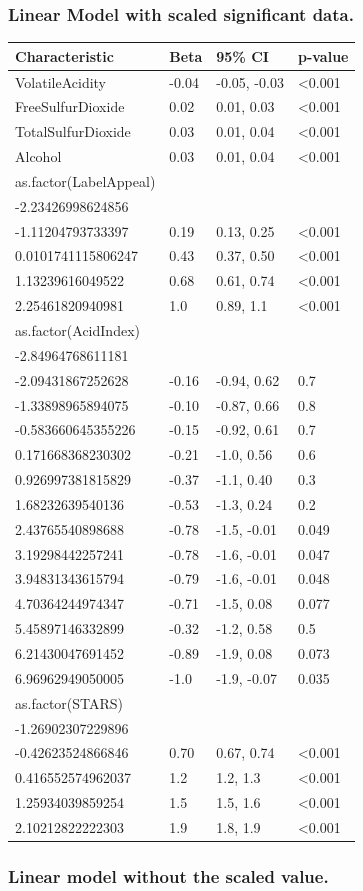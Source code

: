 \documentclass[]{elsarticle} %
\begin{document}
\hypertarget{linear-model-with-scaled-significant-data.}{%
\subsubsection{Linear Model with scaled significant
data.}\label{linear-model-with-scaled-significant-data.}}

\begin{longtable}[]{@{}llll@{}}
\toprule
\textbf{Characteristic} & \textbf{Beta} & \textbf{95\% CI} &
\textbf{p-value}\tabularnewline
\midrule
\endhead
VolatileAcidity & -0.04 & -0.05, -0.03 & \textless0.001\tabularnewline
FreeSulfurDioxide & 0.02 & 0.01, 0.03 & \textless0.001\tabularnewline
TotalSulfurDioxide & 0.03 & 0.01, 0.04 & \textless0.001\tabularnewline
Alcohol & 0.03 & 0.01, 0.04 & \textless0.001\tabularnewline
as.factor(LabelAppeal) & & &\tabularnewline
-2.23426998624856 & & &\tabularnewline
-1.11204793733397 & 0.19 & 0.13, 0.25 & \textless0.001\tabularnewline
0.0101741115806247 & 0.43 & 0.37, 0.50 & \textless0.001\tabularnewline
1.13239616049522 & 0.68 & 0.61, 0.74 & \textless0.001\tabularnewline
2.25461820940981 & 1.0 & 0.89, 1.1 & \textless0.001\tabularnewline
as.factor(AcidIndex) & & &\tabularnewline
-2.84964768611181 & & &\tabularnewline
-2.09431867252628 & -0.16 & -0.94, 0.62 & 0.7\tabularnewline
-1.33898965894075 & -0.10 & -0.87, 0.66 & 0.8\tabularnewline
-0.583660645355226 & -0.15 & -0.92, 0.61 & 0.7\tabularnewline
0.171668368230302 & -0.21 & -1.0, 0.56 & 0.6\tabularnewline
0.926997381815829 & -0.37 & -1.1, 0.40 & 0.3\tabularnewline
1.68232639540136 & -0.53 & -1.3, 0.24 & 0.2\tabularnewline
2.43765540898688 & -0.78 & -1.5, -0.01 & 0.049\tabularnewline
3.19298442257241 & -0.78 & -1.6, -0.01 & 0.047\tabularnewline
3.94831343615794 & -0.79 & -1.6, -0.01 & 0.048\tabularnewline
4.70364244974347 & -0.71 & -1.5, 0.08 & 0.077\tabularnewline
5.45897146332899 & -0.32 & -1.2, 0.58 & 0.5\tabularnewline
6.21430047691452 & -0.89 & -1.9, 0.08 & 0.073\tabularnewline
6.96962949050005 & -1.0 & -1.9, -0.07 & 0.035\tabularnewline
as.factor(STARS) & & &\tabularnewline
-1.26902307229896 & & &\tabularnewline
-0.42623524866846 & 0.70 & 0.67, 0.74 & \textless0.001\tabularnewline
0.416552574962037 & 1.2 & 1.2, 1.3 & \textless0.001\tabularnewline
1.25934039859254 & 1.5 & 1.5, 1.6 & \textless0.001\tabularnewline
2.10212822222303 & 1.9 & 1.8, 1.9 & \textless0.001\tabularnewline
\bottomrule
\end{longtable}

\hypertarget{linear-model-without-the-scaled-value.}{%
\subsubsection{Linear model without the scaled
value.}\label{linear-model-without-the-scaled-value.}}
\end{document}
